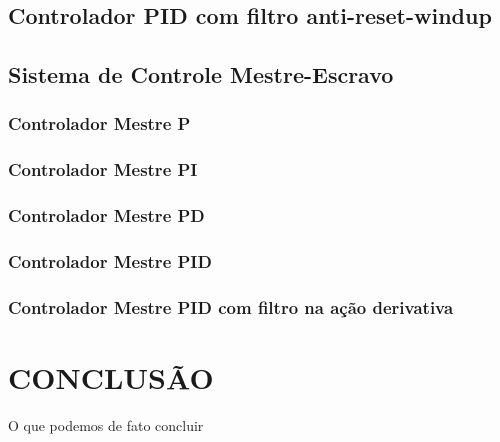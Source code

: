 \documentclass[a4paper,12pt]{article}
\begin{document}
\subsection{Controlador PID com filtro anti-reset-windup}\hspace{4ex}
\newpage

\subsection{Sistema de Controle Mestre-Escravo}
\newpage


\subsubsection{Controlador Mestre P}

\subsubsection{Controlador Mestre PI}

\subsubsection{Controlador Mestre PD}

\subsubsection{Controlador Mestre PID}

\subsubsection{Controlador Mestre PID com filtro na ação derivativa }

\newpage


\thispagestyle{main}

\section{CONCLUSÃO}\hspace{4ex}
O que podemos de fato concluir

\newpage




{}


\appendix


\end{document}
